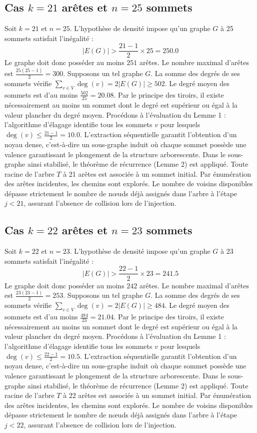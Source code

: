 \documentclass[12pt,a4paper]{article}
\begin{document}
\subsection{Cas $k = 21$ arêtes et $n = 25$ sommets}
Soit $k = 21$ et $n = 25$. L'hypothèse de densité impose qu'un graphe $G$ à 25 sommets satisfait l'inégalité :
$$ |E(G)| > \frac{21-1}{2} \times 25 = 250.0 $$
Le graphe doit donc posséder au moins $251$ arêtes. Le nombre maximal d'arêtes est $\frac{25(25-1)}{2} = 300$.
Supposons un tel graphe $G$. La somme des degrés de ses sommets vérifie $\sum_{v \in V} \deg(v) = 2|E(G)| \geq 502$.
Le degré moyen des sommets est d'au moins $\frac{502}{25} = 20.08$.
Par le principe des tiroirs, il existe nécessairement au moins un sommet dont le degré est supérieur ou égal à la valeur plancher du degré moyen.
Procédons à l'évaluation du Lemme 1 : l'algorithme d'élagage identifie tous les sommets $v$ pour lesquels $\deg(v) \leq \frac{21-1}{2} = 10.0$.
L'extraction séquentielle garantit l'obtention d'un noyau dense, c'est-à-dire un sous-graphe induit où chaque sommet possède une valence garantissant le plongement de la structure arborescente.
Dans le sous-graphe ainsi stabilisé, le théorème de récurrence (Lemme 2) est appliqué. Toute racine de l'arbre $T$ à 21 arêtes est associée à un sommet initial. Par énumération des arêtes incidentes, les chemins sont explorés. Le nombre de voisins disponibles dépasse strictement le nombre de nœuds déjà assignés dans l'arbre à l'étape $j < 21$, assurant l'absence de collision lors de l'injection.

\subsection{Cas $k = 22$ arêtes et $n = 23$ sommets}
Soit $k = 22$ et $n = 23$. L'hypothèse de densité impose qu'un graphe $G$ à 23 sommets satisfait l'inégalité :
$$ |E(G)| > \frac{22-1}{2} \times 23 = 241.5 $$
Le graphe doit donc posséder au moins $242$ arêtes. Le nombre maximal d'arêtes est $\frac{23(23-1)}{2} = 253$.
Supposons un tel graphe $G$. La somme des degrés de ses sommets vérifie $\sum_{v \in V} \deg(v) = 2|E(G)| \geq 484$.
Le degré moyen des sommets est d'au moins $\frac{484}{23} = 21.04$.
Par le principe des tiroirs, il existe nécessairement au moins un sommet dont le degré est supérieur ou égal à la valeur plancher du degré moyen.
Procédons à l'évaluation du Lemme 1 : l'algorithme d'élagage identifie tous les sommets $v$ pour lesquels $\deg(v) \leq \frac{22-1}{2} = 10.5$.
L'extraction séquentielle garantit l'obtention d'un noyau dense, c'est-à-dire un sous-graphe induit où chaque sommet possède une valence garantissant le plongement de la structure arborescente.
Dans le sous-graphe ainsi stabilisé, le théorème de récurrence (Lemme 2) est appliqué. Toute racine de l'arbre $T$ à 22 arêtes est associée à un sommet initial. Par énumération des arêtes incidentes, les chemins sont explorés. Le nombre de voisins disponibles dépasse strictement le nombre de nœuds déjà assignés dans l'arbre à l'étape $j < 22$, assurant l'absence de collision lors de l'injection.
\end{document}
